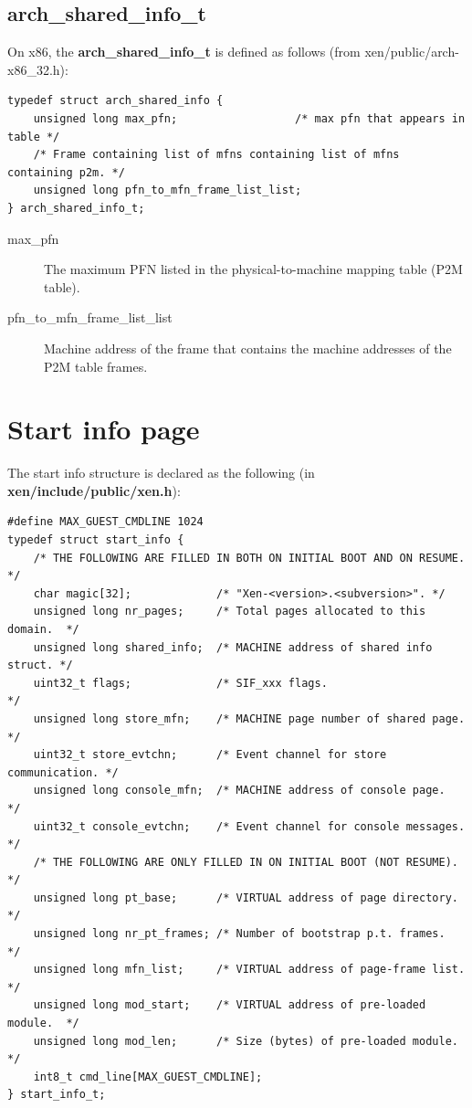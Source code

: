 \documentclass[11pt,twoside,final,openright,a4paper]{report}
\begin{document}
\subsection{arch\_shared\_info\_t}

On x86, the {\bf arch\_shared\_info\_t} is defined as follows (from
xen/public/arch-x86\_32.h):

\scriptsize
\begin{verbatim}
typedef struct arch_shared_info {
    unsigned long max_pfn;                  /* max pfn that appears in table */
    /* Frame containing list of mfns containing list of mfns containing p2m. */
    unsigned long pfn_to_mfn_frame_list_list; 
} arch_shared_info_t;
\end{verbatim}
\normalsize

\begin{description}
\item[max\_pfn] The maximum PFN listed in the physical-to-machine
  mapping table (P2M table).
\item[pfn\_to\_mfn\_frame\_list\_list] Machine address of the frame
  that contains the machine addresses of the P2M table frames.
\end{description}

\section{Start info page}

The start info structure is declared as the following (in {\bf
xen/include/public/xen.h}):

\scriptsize
\begin{verbatim}
#define MAX_GUEST_CMDLINE 1024
typedef struct start_info {
    /* THE FOLLOWING ARE FILLED IN BOTH ON INITIAL BOOT AND ON RESUME.    */
    char magic[32];             /* "Xen-<version>.<subversion>". */
    unsigned long nr_pages;     /* Total pages allocated to this domain.  */
    unsigned long shared_info;  /* MACHINE address of shared info struct. */
    uint32_t flags;             /* SIF_xxx flags.                         */
    unsigned long store_mfn;    /* MACHINE page number of shared page.    */
    uint32_t store_evtchn;      /* Event channel for store communication. */
    unsigned long console_mfn;  /* MACHINE address of console page.       */
    uint32_t console_evtchn;    /* Event channel for console messages.    */
    /* THE FOLLOWING ARE ONLY FILLED IN ON INITIAL BOOT (NOT RESUME).     */
    unsigned long pt_base;      /* VIRTUAL address of page directory.     */
    unsigned long nr_pt_frames; /* Number of bootstrap p.t. frames.       */
    unsigned long mfn_list;     /* VIRTUAL address of page-frame list.    */
    unsigned long mod_start;    /* VIRTUAL address of pre-loaded module.  */
    unsigned long mod_len;      /* Size (bytes) of pre-loaded module.     */
    int8_t cmd_line[MAX_GUEST_CMDLINE];
} start_info_t;
\end{verbatim}
\normalsize
\end{document}
